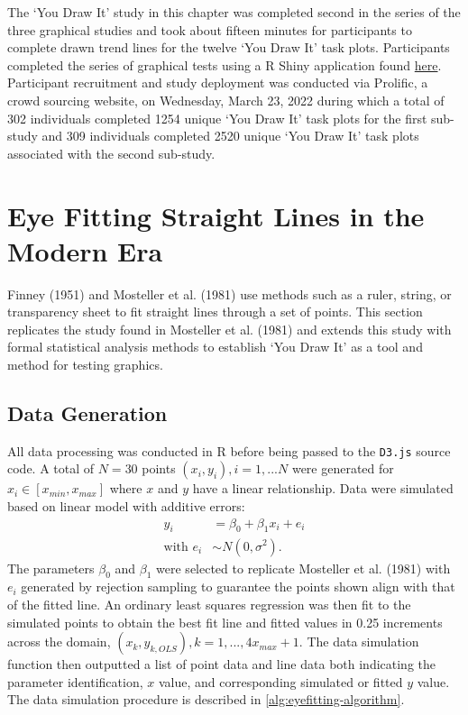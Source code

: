 \documentclass[print]{nuthesis}
\begin{document}
The `You Draw It' study in this chapter was completed second in the series of the three graphical studies and took about fifteen minutes for participants to complete drawn trend lines for the twelve `You Draw It' task plots.
Participants completed the series of graphical tests using a R Shiny application found \href{https://shiny.srvanderplas.com/perception-of-statistical-graphics/}{here}.
Participant recruitment and study deployment was conducted via Prolific, a crowd sourcing website, on Wednesday, March 23, 2022 during which a total of 302 individuals completed 1254 unique `You Draw It' task plots for the first sub-study and 309 individuals completed 2520 unique `You Draw It' task plots associated with the second sub-study.

\hypertarget{eye-fitting-straight-lines-in-the-modern-era}{%
\section{Eye Fitting Straight Lines in the Modern Era}\label{eye-fitting-straight-lines-in-the-modern-era}}

Finney (1951) and Mosteller et al. (1981) use methods such as a ruler, string, or transparency sheet to fit straight lines through a set of points.
This section replicates the study found in Mosteller et al. (1981) and extends this study with formal statistical analysis methods to establish `You Draw It' as a tool and method for testing graphics.

\hypertarget{data-generation-1}{%
\subsection{Data Generation}\label{data-generation-1}}

All data processing was conducted in R before being passed to the \texttt{D3.js} source code.
A total of \(N = 30\) points \((x_i, y_i), i = 1,...N\) were generated for \(x_i \in [x_{min}, x_{max}]\) where \(x\) and \(y\) have a linear relationship.
Data were simulated based on linear model with additive errors:
\begin{align}
y_i & = \beta_0 + \beta_1 x_i + e_i \\
\text{with } e_i & \sim N(0, \sigma^2). \nonumber
\end{align}
The parameters \(\beta_0\) and \(\beta_1\) were selected to replicate Mosteller et al. (1981) with \(e_i\) generated by rejection sampling to guarantee the points shown align with that of the fitted line.
An ordinary least squares regression was then fit to the simulated points to obtain the best fit line and fitted values in 0.25 increments across the domain, \((x_k, \hat y_{k,OLS}), k = 1, ..., 4 x_{max} +1\).
The data simulation function then outputted a list of point data and line data both indicating the parameter identification, \(x\) value, and corresponding simulated or fitted \(y\) value.
The data simulation procedure is described in \cref{alg:eyefitting-algorithm}.
\end{document}
